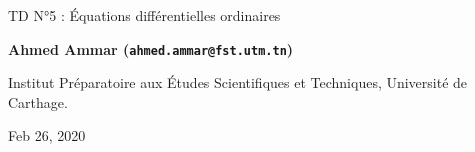 \documentclass[%
oneside,                 %
final,                   %
10pt,french]{article}
\begin{document}

\newcommand{\exercisesection}[1]{\subsection*{#1}}






\thispagestyle{empty}

\begin{center}
{\LARGE\bf
\begin{spacing}{1.25}
TD N°5 : Équations différentielles ordinaires
\end{spacing}
}
\end{center}


\begin{center}
{\bf Ahmed Ammar (\texttt{ahmed.ammar@fst.utm.tn})}
\end{center}

    \begin{center}
\centerline{{\small Institut Préparatoire aux Études Scientifiques et Techniques, Université de Carthage.}}
\end{center}
    

\begin{center}
Feb 26, 2020
\end{center}

\vspace{1cm}


\tableofcontents


\vspace{1cm} %
\end{document}

